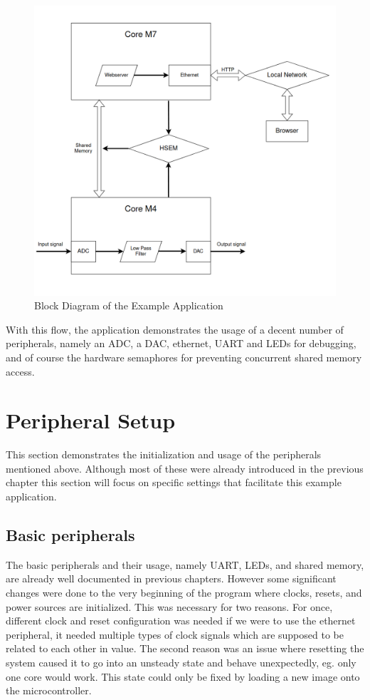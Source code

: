 \begin{figure}[!ht]
    \centering
    \includegraphics[width=150mm, keepaspectratio]{figures/example-app-flowchart.png}
    \caption{Block Diagram of the Example Application}
    \label{fig:app-flowchart}
\end{figure}

With this flow, the application demonstrates the usage of  a decent number of peripherals, namely an ADC, a DAC, ethernet, UART and LEDs for debugging, and of course the hardware semaphores for preventing concurrent shared memory access.

\section{Peripheral Setup}

This section demonstrates the initialization and usage of the peripherals mentioned above. Although most of these were already introduced in the previous chapter this section will focus on specific settings that facilitate this example application.

\subsection{Basic peripherals}

The basic peripherals and their usage, namely UART, LEDs, and shared memory, are already well documented in previous chapters. However some significant changes were done to the very beginning of the program where clocks, resets, and power sources are initialized. This was necessary for two reasons. For once, different clock and reset configuration was needed if we were to use the ethernet peripheral, it needed multiple types of clock signals which are supposed to be related to each other in value. The second reason was an issue where resetting the system caused it to go into an unsteady state and behave unexpectedly, eg. only one core would work. This state could only be fixed by loading a new image onto the microcontroller.

